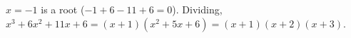 $x=-1$ is a root ($-1+6-11+6=0$). Dividing, $x^3+6x^2+11x+6=(x+1)(x^2+5x+6)=\boxed{(x+1)(x+2)(x+3)}$.

